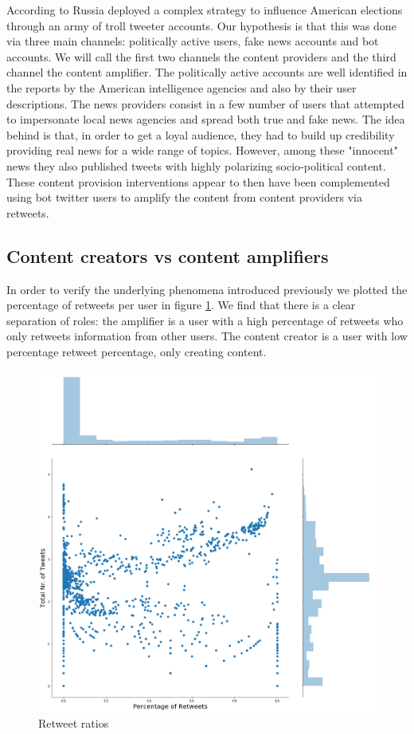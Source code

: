 \documentclass[12pt, authoryear]{elsarticle}
\begin{document}
According to \cite{mueller2019report} Russia deployed a complex strategy to influence American elections through an army of troll tweeter accounts. Our hypothesis is that this was done via three main channels: politically active users, fake news accounts and bot accounts. We will call the first two channels the content providers and the third channel the content amplifier. The politically active accounts are well identified in the reports by the American intelligence agencies and also by their user descriptions. The news providers consist in a few number of users that attempted to impersonate local news agencies and spread both true and fake news. The idea behind is that, in order to get a loyal audience, they had to build up credibility providing real news for a wide range of topics. However, among these "innocent" news they also published tweets with highly polarizing socio-political content. These content provision interventions appear to then have been complemented using bot twitter users to amplify the content from content providers via retweets. 

\subsection{Content creators vs content amplifiers}

In order to verify the underlying phenomena introduced previously we plotted the percentage of retweets per user in figure \ref{retweets:1}. We find that there is a clear separation of roles: the amplifier is a user with a high percentage of retweets who only retweets information from other users. The content creator is a user with low percentage retweet percentage, only creating content.

\begin{figure}[t]
\includegraphics[width=\textwidth]{retweets}
\centering
\caption{Retweet ratios}
\label{retweets:1}
\end{figure}
\end{document}
